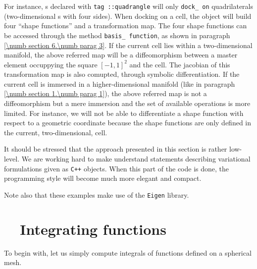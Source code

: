 For instance, {\small\tt{}}s declared with {\small\tt\textcolor{tag}{tag}%
::quadrangle} will only {\small\tt dock\_\,on} quadrilaterals
(two-dimensional {\small\tt{}}s with four sides).
When docking on a cell, the {\small\tt{}} object will build four
``shape functions'' and a transformation map.
The four shape functions can be accessed through the method {\small\tt basis\_\,function},
as shown in paragraph \ref{\numb section 6.\numb parag 3}.
If the current cell lies within a two-dimensional manifold, the above referred map will be
a diffeomorphism between a master element occuppying the square $ [-1, 1]^2 $ and the cell.
The jacobian of this transformation map is also comupted, through symbolic differentiation.
If the current cell is immersed in a higher-dimensional manifold (like in paragraph
\ref{\numb section 1.\numb parag 1}), the above referred map is not a diffeomorphism but
a mere immersion and the set of available operations is more limited.
For instance, we will not be able to differentiate a shape function with respect to a geometric
coordinate because the shape functions are only defined in the current, two-dimensional, cell.

It should be stressed that the approach presented in this section is rather low-level.
We are working hard to make {\maniFEM} understand statements describing variational
formulations given as {\tt C++} objects.
When this part of the code is done, the programming style will become much more elegant
and compact.

Note also that these examples make use of the {\small\tt Eigen} library.


\section{~~Integrating functions}\label{\numb section 6.\numb parag 2}

To begin with, let us simply compute integrals of functions defined on a spherical mesh.

